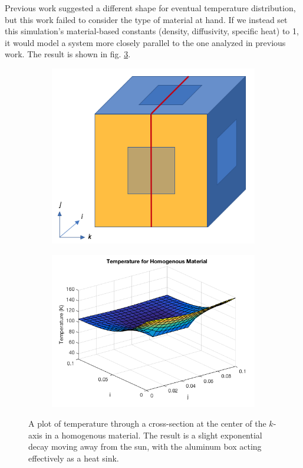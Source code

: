 \documentclass[12pt]{article}
\begin{document}
Previous work suggested a different shape for eventual temperature distribution, but this work failed to consider the type of material at hand.  If we instead set this simulation's material-based constants (density, diffusivity, specific heat) to 1, it would model a system more closely parallel to the one analyzed in previous work.  The result is shown in fig. \ref{homogenouscenteredk}.

\begin{figure}[h!]
\begin{center}
\begin{subfigure}{0.3\textwidth}
\includegraphics[width=\linewidth]{../pics/centeredkpic.png}
\caption{\label{homokpic}}
\end{subfigure}
\begin{subfigure}{0.6\textwidth}
\includegraphics[width=\linewidth]{../pics/homogenous.png}
\caption{\label{homok}}
\end{subfigure}
\caption{\label{homogenouscenteredk}A plot of temperature through a cross-section at the center of the $k$-axis in a homogenous material.  The result is a slight exponential decay moving away from the sun, with the aluminum box acting effectively as a heat sink.}
\end{center}
\end{figure}
\end{document}
